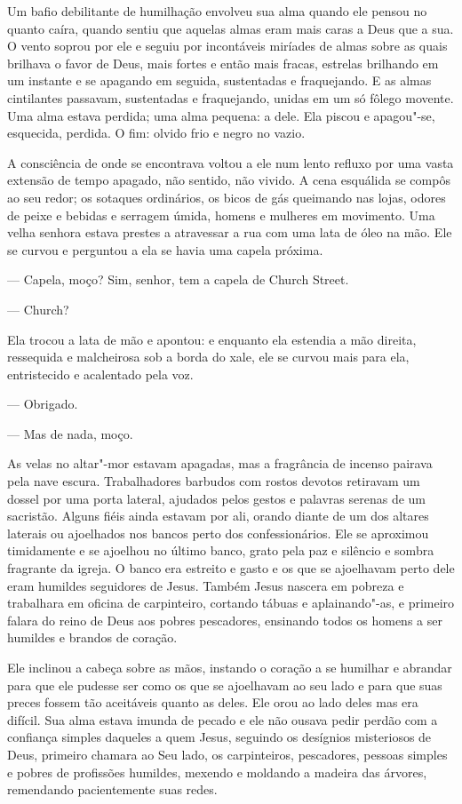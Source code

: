 Um bafio debilitante de humilhação envolveu sua alma quando ele pensou
no quanto caíra, quando sentiu que aquelas almas eram mais caras a Deus
que a sua. O vento soprou por ele e seguiu por incontáveis miríades de
almas sobre as quais brilhava o favor de Deus, mais fortes e então mais
fracas, estrelas brilhando em um instante e se apagando em seguida,
sustentadas e fraquejando. E as almas cintilantes passavam, sustentadas
e fraquejando, unidas em um só fôlego movente. Uma alma estava perdida;
uma alma pequena: a dele. Ela piscou e apagou"-se, esquecida, perdida. O
fim: olvido frio e negro no vazio.

A consciência de onde se encontrava voltou a ele num lento refluxo por
uma vasta extensão de tempo apagado, não sentido, não vivido. A cena
esquálida se compôs ao seu redor; os sotaques ordinários, os bicos de
gás queimando nas lojas, odores de peixe e bebidas e serragem úmida,
homens e mulheres em movimento. Uma velha senhora estava prestes a
atravessar a rua com uma lata de óleo na mão. Ele se curvou e perguntou
a ela se havia uma capela próxima.

 --- Capela, moço? Sim, senhor, tem a capela de Church Street.

 --- Church?

Ela trocou a lata de mão e apontou: e enquanto ela estendia a mão
direita, ressequida e malcheirosa sob a borda do xale, ele se curvou
mais para ela, entristecido e acalentado pela voz.

 --- Obrigado.

 --- Mas de nada, moço.

As velas no altar"-mor estavam apagadas, mas a fragrância de incenso
pairava pela nave escura. Trabalhadores barbudos com rostos devotos
retiravam um dossel por uma porta lateral, ajudados pelos gestos e
palavras serenas de um sacristão. Alguns fiéis ainda estavam por ali,
orando diante de um dos altares laterais ou ajoelhados nos bancos perto
dos confessionários. Ele se aproximou timidamente e se ajoelhou no
último banco, grato pela paz e silêncio e sombra fragrante da igreja. O
banco era estreito e gasto e os que se ajoelhavam perto dele eram
humildes seguidores de Jesus. Também Jesus nascera em pobreza e
trabalhara em oficina de carpinteiro, cortando tábuas e aplainando"-as,
e primeiro falara do reino de Deus aos pobres pescadores, ensinando
todos os homens a ser humildes e brandos de coração.

Ele inclinou a cabeça sobre as mãos, instando o coração a se humilhar e
abrandar para que ele pudesse ser como os que se ajoelhavam ao seu lado
e para que suas preces fossem tão aceitáveis quanto as deles. Ele orou
ao lado deles mas era difícil. Sua alma estava imunda de pecado e ele
não ousava pedir perdão com a confiança simples daqueles a quem Jesus,
seguindo os desígnios misteriosos de Deus, primeiro chamara ao Seu
lado, os carpinteiros, pescadores, pessoas simples e pobres de
profissões humildes, mexendo e moldando a madeira das árvores,
remendando pacientemente suas redes.

